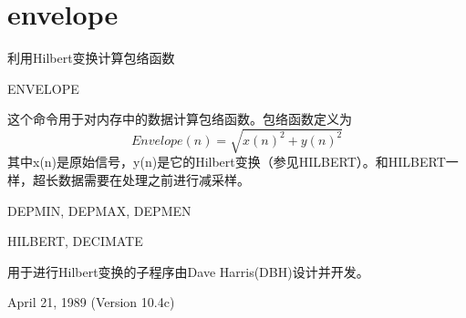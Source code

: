 \section{envelope}
\label{cmd:envelope}

利用Hilbert变换计算包络函数

ENVELOPE

这个命令用于对内存中的数据计算包络函数。包络函数定义为
	\[ Envelope(n)= \sqrt{x(n)^2+y(n)^2} \]
其中x(n)是原始信号，y(n)是它的Hilbert变换（参见HILBERT）。和HILBERT一样，超长数据需要在处理之前进行减采样。

DEPMIN, DEPMAX, DEPMEN

HILBERT, DECIMATE

用于进行Hilbert变换的子程序由Dave Harris(DBH)设计并开发。

April 21, 1989 (Version 10.4c)
